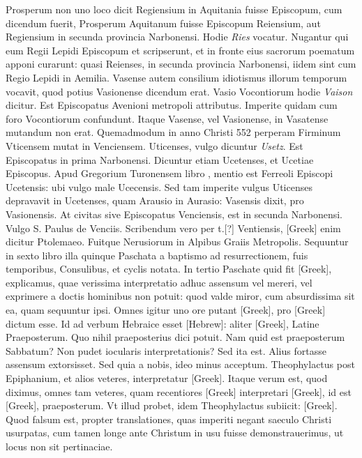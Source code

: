 Prosperum non uno
loco dicit Regiensium in Aquitania fuisse Episcopum, cum dicendum
fuerit, Prosperum Aquitanum fuisse Episcopum Reiensium,
aut Regiensium in secunda provincia Narbonensi.
Hodie \textit{Ries} vocatur.
Nugantur qui eum Regii Lepidi Episcopum et scripserunt,
et in fronte eius sacrorum poematum apponi curarunt: quasi Reienses,
in secunda provincia Narbonensi, iidem sint cum Regio Lepidi
in Aemilia.
Vasense autem consilium idiotismus illorum temporum
vocavit, quod potius Vasionense dicendum erat.
Vasio Vocontiorum hodie \textit{Vaison} dicitur.
Est Episcopatus Avenioni metropoli
attributus.
Imperite quidam cum foro Vocontiorum confundunt.
Itaque Vasense, vel Vasionense, in Vasatense mutandum non
erat.
Quemadmodum in anno Christi 552 perperam Firminum
Vticensem mutat in Venciensem.
Uticenses, vulgo dicuntur \textit{Usetz}.
Est Episcopatus in prima Narbonensi.
Dicuntur etiam Ucetenses,
et Ucetiae Episcopus.
Apud Gregorium Turonensem libro ,
mentio est Ferreoli Episcopi Ucetensis: ubi vulgo male Ucecensis.
Sed tam imperite vulgus Uticenses depravavit in Ucetenses, quam
Arausio in Aurasio: Vasensis dixit, pro Vasionensis.
At civitas sive
Episcopatus Venciensis, est in secunda Narbonensi. Vulgo S. Paulus
de Venciis.
Scribendum vero per t.[?] Ventiensis, \textgreek{[Greek]} enim dicitur
Ptolemaeo.
Fuitque Nerusiorum in Alpibus Graiis Metropolis.
Sequuntur in sexto libro illa quinque Paschata a baptismo
ad resurrectionem, fuis temporibus, Consulibus, et cyclis notata.
In tertio Paschate quid fit \textgreek{[Greek]}, explicamus,
quae verissima interpretatio adhuc assensum vel mereri, vel
exprimere a doctis hominibus non potuit: quod valde miror,
cum absurdissima sit ea, quam sequuntur ipsi.
Omnes igitur uno
ore putant \textgreek{[Greek]}, pro \textgreek{[Greek]} dictum esse.
Id ad verbum
Hebraice esset \texthebrew{[Hebrew]}:
 aliter \textgreek{[Greek]}, Latine Praeposterum.
Quo nihil praeposterius dici potuit.
Nam quid est praeposterum Sabbatum?
Non pudet iocularis interpretationis?
Sed ita est.
Alius fortasse assensum extorsisset.
Sed quia a nobis, ideo
minus acceptum.
Theophylactus post Epiphanium, et alios veteres,
interpretatur \textgreek{[Greek]}.
Itaque verum est, quod diximus, omnes tam veteres, quam
recentiores \textgreek{[Greek]} interpretari
 \textgreek{[Greek]}, id est \textgreek{[Greek]},
praeposterum.
Vt illud probet, idem Theophylactus
subiicit: \textgreek{[Greek]}.
Quod falsum est,
propter translationes, quas imperiti negant saeculo Christi usurpatas,
cum tamen longe ante Christum in usu fuisse demonstrauerimus,
ut locus non sit pertinaciae.

